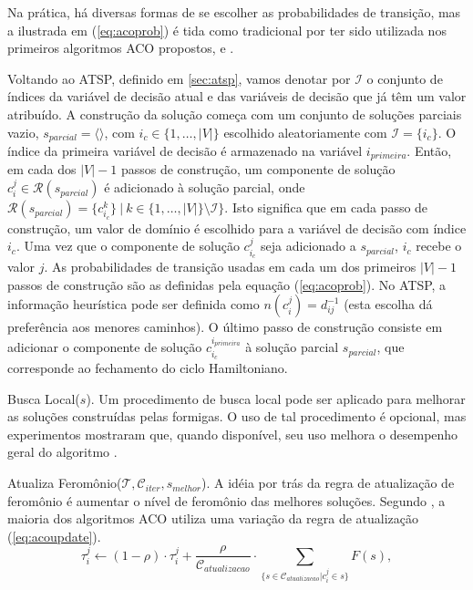 Na prática, há diversas formas de se escolher as probabilidades de transição,
mas a ilustrada em (\ref{eq:acoprob}) é tida como tradicional por ter sido
utilizada nos primeiros algoritmos ACO propostos, \cite{dorigo1991positive} e
\cite{dorigo1996ant}.

Voltando ao ATSP, definido em \ref{sec:atsp}, vamos denotar por $\mathcal{I}$ o
conjunto de índices da variável de decisão atual e das variáveis de decisão que
já têm um valor atribuído. A construção da solução começa com um conjunto de
soluções parciais vazio, $s_{parcial} = \langle \rangle$, com $i_{c} \in \{1,
\ldots, |V|\}$ escolhido aleatoriamente com $\mathcal{I} = \{i_{c}\}$. O índice
da primeira variável de decisão é armazenado na variável $i_{primeira}$. Então,
em cada dos $|V|-1$ passos de construção, um componente de solução $c_{i}^{j}
\in \mathcal{R}(s_{parcial})$ é adicionado à solução parcial, onde
$\mathcal{R}(s_{parcial}) = \{c_{i_{c}}^{k}\}\ |\ k \in \{1, \ldots, |V|\}
\setminus \mathcal{I}\}$. Isto significa que em cada passo de construção, um
valor de domínio é escolhido para a variável de decisão com índice $i_{c}$. Uma
vez que o componente de solução $c_{i_{c}}^{j}$ seja adicionado a
$s_{parcial}$, $i_{c}$ recebe o valor $j$. As probabilidades de transição
usadas em cada um dos primeiros $|V|-1$ passos de construção são as definidas
pela equação (\ref{eq:acoprob}). No ATSP, a informação heurística pode ser
definida como $n(c_{i}^{j}) = d_{ij}^{-1}$ (esta escolha dá preferência aos
menores caminhos). O último passo de construção consiste em adicionar o
componente de solução $c_{i_{c}}^{i_{primeira}}$ à solução parcial
$s_{parcial}$, que corresponde ao fechamento do ciclo Hamiltoniano.

Busca Local($s$). Um procedimento de busca local pode ser aplicado para
melhorar as soluções construídas pelas formigas. O uso de tal procedimento é
opcional, mas experimentos mostraram que, quando disponível, seu uso melhora o
desempenho geral do algoritmo \cite{dorigo2005ant}.

Atualiza Feromônio($\mathcal{T}, \mathcal{C}_{iter}, s_{melhor}$). A idéia por
trás da regra de atualização de feromônio é aumentar o nível de feromônio das
melhores soluções. Segundo \cite{dorigo2005ant}, a maioria dos algoritmos ACO
utiliza uma variação da regra de atualização (\ref{eq:acoupdate}).
\begin{equation}
\label{eq:acoupdate}
\tau_{i}^{j} \gets (1 - \rho) \cdot \tau_{i}^{j} +
\frac{\rho}{\mathcal{C}_{atualizacao}} \cdot \sum_{\{s \in
\mathcal{C}_{atualizacao} | c_{i}^{j} \in s\}} F(s),
\end{equation}

